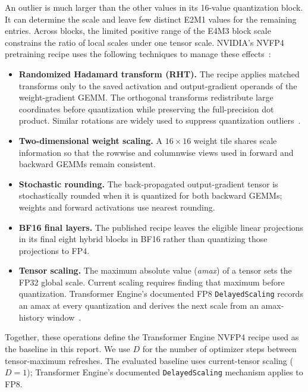 \documentclass[11pt]{article}
\newcommand{\nv}{NVFP4}
\begin{document}
An outlier is much larger than the other values in its 16-value quantization
block.  It can determine the scale and leave few distinct E2M1 values
for the remaining entries.  Across blocks, the limited positive range of the
E4M3 block scale constrains the ratio of local scales under one tensor scale.
NVIDIA's \nv{} pretraining recipe uses the following techniques to manage
these effects~\citep{nvidia2025nvfp4}:

\begin{itemize}
  \item \textbf{Randomized Hadamard transform (RHT).}  The recipe applies
        matched transforms only to the saved
        activation and output-gradient operands of the weight-gradient GEMM.
        The orthogonal transforms redistribute large coordinates before
        quantization while preserving the full-precision dot product.  Similar
        rotations are widely used to suppress quantization
        outliers~\citep{ashkboos2024quarot}.
  \item \textbf{Two-dimensional weight scaling.}  A $16\times16$ weight tile
        shares scale information so that the rowwise and columnwise views used
        in forward and backward GEMMs remain consistent.
  \item \textbf{Stochastic rounding.}  The back-propagated output-gradient
        tensor is stochastically rounded when it is quantized for both backward
        GEMMs; weights and forward activations use nearest rounding.
  \item \textbf{BF16 final layers.}  The published recipe leaves the eligible
        linear projections in its final eight hybrid blocks in BF16 rather than
        quantizing those projections to FP4.
  \item \textbf{Tensor scaling.}  The maximum absolute value (\emph{amax}) of a tensor sets
        the FP32 global scale.  Current scaling requires finding that maximum
        before quantization.  Transformer Engine's documented FP8
        \texttt{DelayedScaling} records an amax at every quantization and
        derives the next scale from an amax-history window~\citep{nvidia2026delayeddocs}.
\end{itemize}

Together, these operations define the Transformer Engine \nv{} recipe used as
the baseline in this report.  We use $D$ for the number of optimizer steps
between tensor-maximum refreshes.  The evaluated baseline uses current-tensor
scaling ($D=1$); Transformer Engine's documented \texttt{DelayedScaling}
mechanism applies to FP8.
\end{document}
